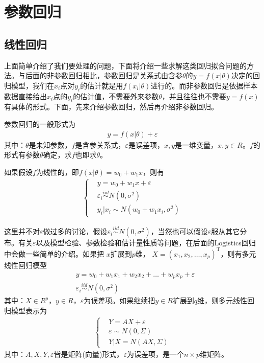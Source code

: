 \section{参数回归}
    \subsection{线性回归}
        \par
        上面简单介绍了我们要处理的问题，下面将介绍一些求解这类回归拟合问题的方法。与后面的非参数回归相比，参数回归是关系式由含参$\theta$的$y = f(x|\theta)$决定的回归模型，我们在$x_i$点对$y_i$的估计就是用$f(x_i|\theta)$进行的。而非参数回归是依据样本数据直接给出$x_i$点的$y_i$的估计值，不需要外来参数$\theta$，并且往往也不需要$y = f(x)$有具体的形式。下面，先来介绍参数回归，然后再介绍非参数回归。
        \par
        参数回归的一般形式为
        \begin{align*}
        y = f(x|\theta) + \varepsilon
        \end{align*}
        其中：$\theta$是未知参数，$f$是含参关系式，$\varepsilon$是误差项，$x,y$是一维变量，$x,y\in R$。$f$的形式有参数$\theta$确定，求$f$也即求$\theta$。
        \par
        如果假设$f$为线性的，即$f(x|\theta) = w_0+w_1 x$，则有
        \begin{align*}
        \left\{
        \begin{aligned}
        &y=w_0+w_1 x+\varepsilon\\
        &\varepsilon_i \overset{iid}{\sim} N(0,\sigma^2) \\
        &y_i|x_i \sim N(w_0+w_1 x_i,\sigma^2)
        \end{aligned}
        \right.
        \end{align*}
        \par
        这里并不对$\varepsilon$做过多的讨论，假设$\varepsilon_i \overset{iid}{\sim} N(0,\sigma^2) $，当然也可以假设$\varepsilon$服从其它分布。有关$\varepsilon$以及模型检验、参数检验和估计量性质等问题，在后面的Logistics回归中会做一些简单的介绍。如果把 $x$扩展到$p$维， $X = (x_1,x_2,\dots,x_p)^{\mathrm{T}}$，则有多元线性回归模型
        \begin{align*}
        &y = w_0+w_1x_1+w_2x_2+\dots+w_px_p +\varepsilon\\
        &\varepsilon_i \overset{iid}{\sim} N(0,\sigma^2)
        \end{align*}
        其中：$X\in R^p$，$y\in R$，$\varepsilon$为误差项。如果继续把$y\in R$扩展到$q$维，则多元线性回归模型表示为
        \begin{align*}
        \left\{
          \begin{aligned}
          &Y = A X + \varepsilon \\
          &\varepsilon \sim N(0,\Sigma)\\
          &Y |X = N(AX,\Sigma)
          \end{aligned}
        \right.
        \end{align*}
        其中：$A,X,Y,\varepsilon$皆是矩阵(向量)形式，$\varepsilon$为误差项，是一个$n\times p$维矩阵。
